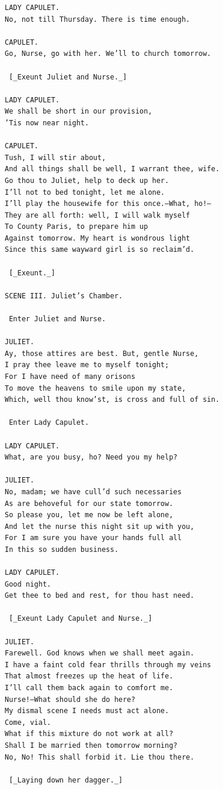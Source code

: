 \documentclass{article}
\begin{document}
\begin{verbatim}
LADY CAPULET.
No, not till Thursday. There is time enough.

CAPULET.
Go, Nurse, go with her. We’ll to church tomorrow.

 [_Exeunt Juliet and Nurse._]

LADY CAPULET.
We shall be short in our provision,
’Tis now near night.

CAPULET.
Tush, I will stir about,
And all things shall be well, I warrant thee, wife.
Go thou to Juliet, help to deck up her.
I’ll not to bed tonight, let me alone.
I’ll play the housewife for this once.—What, ho!—
They are all forth: well, I will walk myself
To County Paris, to prepare him up
Against tomorrow. My heart is wondrous light
Since this same wayward girl is so reclaim’d.

 [_Exeunt._]

SCENE III. Juliet’s Chamber.

 Enter Juliet and Nurse.

JULIET.
Ay, those attires are best. But, gentle Nurse,
I pray thee leave me to myself tonight;
For I have need of many orisons
To move the heavens to smile upon my state,
Which, well thou know’st, is cross and full of sin.

 Enter Lady Capulet.

LADY CAPULET.
What, are you busy, ho? Need you my help?

JULIET.
No, madam; we have cull’d such necessaries
As are behoveful for our state tomorrow.
So please you, let me now be left alone,
And let the nurse this night sit up with you,
For I am sure you have your hands full all
In this so sudden business.

LADY CAPULET.
Good night.
Get thee to bed and rest, for thou hast need.

 [_Exeunt Lady Capulet and Nurse._]

JULIET.
Farewell. God knows when we shall meet again.
I have a faint cold fear thrills through my veins
That almost freezes up the heat of life.
I’ll call them back again to comfort me.
Nurse!—What should she do here?
My dismal scene I needs must act alone.
Come, vial.
What if this mixture do not work at all?
Shall I be married then tomorrow morning?
No, No! This shall forbid it. Lie thou there.

 [_Laying down her dagger._]


\end{verbatim}
\end{document}
